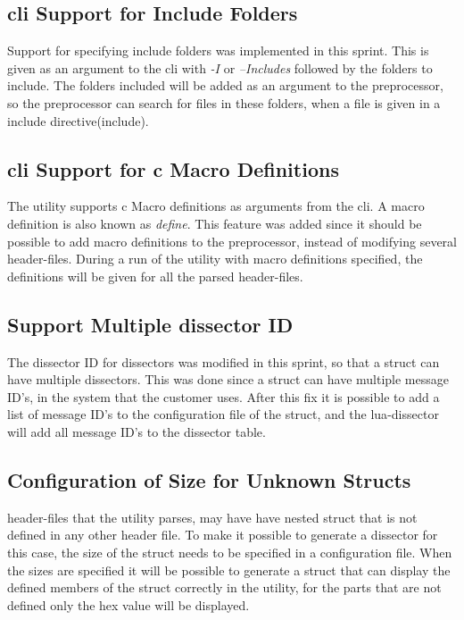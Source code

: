\subsection{\gls{cli} Support for Include Folders}
Support for specifying include folders was implemented in this sprint. This is 
given as an argument to the \gls{cli} with \emph{-I} or \emph{--Includes} followed 
by the folders to include. The folders included will be added as an argument 
to the \gls{preprocessor}, so the \gls{preprocessor} can search for files in these 
folders, when a file is given in a include directive(\gls{include}).

\subsection{\gls{cli} Support for \Gls{c} Macro Definitions}
The \gls{utility} supports \Gls{c} Macro definitions as arguments from the \gls{cli}. A macro 
definition is also known as \emph{\gls{define}}. This feature was added since it 
should be possible to add macro definitions to the \gls{preprocessor}, instead of 
modifying several \gls{header}-files. During a run of the \gls{utility} with macro 
definitions specified, the definitions will be given for all the parsed 
\gls{header}-files.

\subsection{Support Multiple \gls{dissector} ID}
The \gls{dissector} ID for \glspl{dissector} was modified in this sprint, so that a \gls{struct} 
can have multiple \glspl{dissector}. This was done since a \gls{struct} can have multiple 
message ID's, in the system that the customer uses. After this fix it is 
possible to add a list of message ID's to the configuration file of the 
\gls{struct}, and the \Gls{lua}-\gls{dissector} will add all message ID's to the \gls{dissector} table.

\subsection{Configuration of Size for Unknown Structs}
\Gls{header}-files that the \gls{utility} parses, may have have nested \gls{struct} that is not 
defined in any other \gls{header} file. To make it possible to generate a 
\gls{dissector} for this case, the size of the \gls{struct} needs to be specified
in a configuration file. When the sizes are specified it will be possible to 
generate a \gls{struct} that can display the defined \glspl{member} of the \gls{struct} correctly 
in the \gls{utility}, for the parts that are not defined only the hex value will be 
displayed. 

